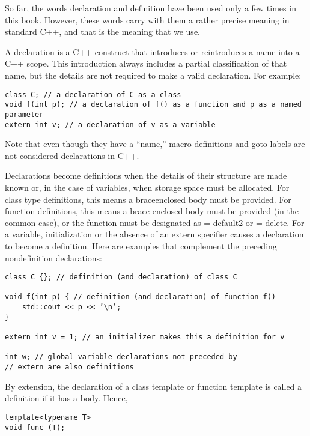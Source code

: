 
So far, the words declaration and definition have been used only a few times in this book. However, these words carry with them a rather precise meaning in standard C++, and that is the meaning that we use.

A declaration is a C++ construct that introduces or reintroduces a name into a C++ scope. This introduction always includes a partial classification of that name, but the details are not required to make a valid declaration. For example:

\begin{lstlisting}[style=styleCXX]
class C; // a declaration of C as a class
void f(int p); // a declaration of f() as a function and p as a named parameter
extern int v; // a declaration of v as a variable
\end{lstlisting}

Note that even though they have a “name,” macro definitions and goto labels are not considered declarations in C++.

Declarations become definitions when the details of their structure are made known or, in the case of variables, when storage space must be allocated. For class type definitions, this means a braceenclosed body must be provided. For function definitions, this means a brace-enclosed body must be provided (in the common case), or the function must be designated as = default2 or = delete. For a variable, initialization or the absence of an extern specifier causes a declaration to become a definition. Here are examples that complement the preceding nondefinition declarations:

\begin{lstlisting}[style=styleCXX]
class C {}; // definition (and declaration) of class C

void f(int p) { // definition (and declaration) of function f()
	std::cout << p << ’\n’;
}

extern int v = 1; // an initializer makes this a definition for v

int w; // global variable declarations not preceded by
// extern are also definitions
\end{lstlisting}

By extension, the declaration of a class template or function template is called a definition if it has a body. Hence,

\begin{lstlisting}[style=styleCXX]
template<typename T>
void func (T);
\end{lstlisting}

